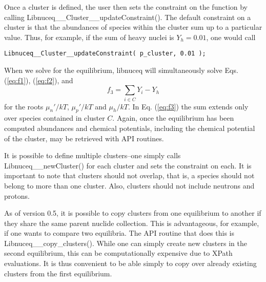 \documentclass{article}    %
\begin{document}
\begin{enumerate}
Once a cluster is defined, the user then sets the constraint on the
function by calling Libnuceq\_\_Cluster\_\_updateConstraint().  The
default constraint on a cluster is that the abundances of species
within the cluster sum up to a particular value.  Thus, for example,
if the sum of heavy nuclei is $Y_h = 0.01$, one would call
\begin{verbatim}
Libnuceq__Cluster__updateConstraint( p_cluster, 0.01 );
\end{verbatim}
When we solve for the equilibrium, libnuceq will simultaneously solve
Eqs. (\ref{eq:f1}), (\ref{eq:f2}), and
\begin{equation}
f_3 = \sum_{i\in C} Y_i - Y_h
\label{eq:f3}
\end{equation}
for the roots $\mu_n'/kT$, $\mu_p'/kT$ and $\mu_h/kT$.  In Eq. (\ref{eq:f3})
the sum extends only over species contained in cluster $C$. Again, once the
equilibrium has been computed abundances and chemical potentials, including
the chemical potential of the cluster, may be retrieved with API routines.

It is possible to define multiple clusters--one simply calls
Libnuceq\_\_newCluster() for each cluster and sets the constraint on each.
It is important to note that clusters should not overlap, that is, a
species should not belong to more than one cluster.  Also, clusters should
not include neutrons and protons.

As of version 0.5, it is possible to copy clusters from one equilibrium
to another if they share the same parent nuclide collection.  This is
advantageous, for example, if one wants to compare two equilibria.
The API routine that does this is Libnuceq\_\_copy\_clusters().  While one
can simply create new clusters in the second equilibrium, this can
be computationally expensive due to XPath evaluations.
It is thus convenient to be able simply to copy over already
existing clusters from the first equilibrium. 


\end{enumerate}
\end{document}
